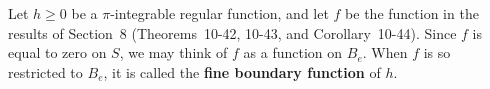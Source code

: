 Let $h \geq 0$ be a $\pi$-integrable regular function, and let $f$ be the function in the results of Section~8 (Theorems~10-42, 10-43, and Corollary~10-44). Since $f$ is equal to zero on $S$, we may think of $f$ as a function on $B_e$. When $f$ is so restricted to $B_e$, it is called the \textbf{fine boundary function} of $h$.
